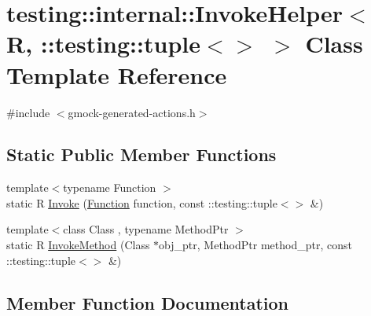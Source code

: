 \hypertarget{classtesting_1_1internal_1_1_invoke_helper_3_01_r_00_01_1_1testing_1_1tuple_3_4_01_4}{}\section{testing\+:\+:internal\+:\+:Invoke\+Helper$<$ R, \+:\+:testing\+:\+:tuple$<$$>$ $>$ Class Template Reference}
\label{classtesting_1_1internal_1_1_invoke_helper_3_01_r_00_01_1_1testing_1_1tuple_3_4_01_4}


{\ttfamily \#include $<$gmock-\/generated-\/actions.\+h$>$}

\subsection*{Static Public Member Functions}
\begin{DoxyCompactItemize}
\item 
{\footnotesize template$<$typename Function $>$ }\\static R \hyperlink{classtesting_1_1internal_1_1_invoke_helper_3_01_r_00_01_1_1testing_1_1tuple_3_4_01_4_a55e6218235e69a896d88a3076a2c6150}{Invoke} (\hyperlink{structtesting_1_1internal_1_1_function}{Function} function, const \+::testing\+::tuple$<$$>$ \&)
\item 
{\footnotesize template$<$class Class , typename Method\+Ptr $>$ }\\static R \hyperlink{classtesting_1_1internal_1_1_invoke_helper_3_01_r_00_01_1_1testing_1_1tuple_3_4_01_4_a0368e26cbc1bcb12abbfb802f8294fa0}{Invoke\+Method} (Class $\ast$obj\+\_\+ptr, Method\+Ptr method\+\_\+ptr, const \+::testing\+::tuple$<$$>$ \&)
\end{DoxyCompactItemize}


\subsection{Member Function Documentation}
\mbox{\label{classtesting_1_1internal_1_1_invoke_helper_3_01_r_00_01_1_1testing_1_1tuple_3_4_01_4_a55e6218235e69a896d88a3076a2c6150}} 
